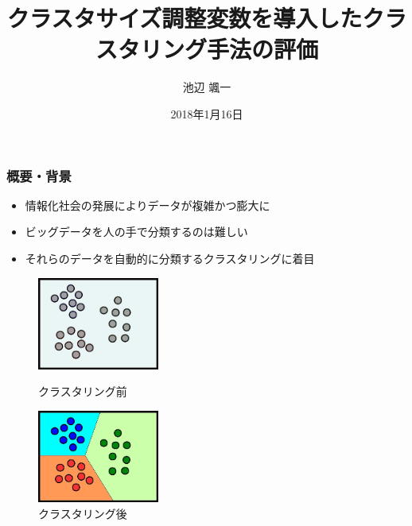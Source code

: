 \documentclass[13pt,dvipdfmx]{beamer}
\title{クラスタサイズ調整変数を導入したクラスタリング手法の評価}
\author{池辺 颯一}
\institute{芝浦工業大学 工学部 通信工学科}
\date{2018年1月16日}
\begin{document}
\begin{frame}\frametitle{}
 \titlepage
\end{frame}

\begin{frame}\frametitle{概要・背景}
\begin{itemize}
 \item 情報化社会の発展によりデータが複雑かつ膨大に
 \item ビッグデータを人の手で分類するのは難しい
 \item それらのデータを自動的に分類するクラスタリングに着目
\end{itemize}
\vspace{5mm}
\begin{figure}[htbp]
 \begin{minipage}{0.4\hsize}
  \begin{center}
   \includegraphics[width=40mm]{before_clustering.png}
  \end{center}
  \captionsetup{labelformat=empty,labelsep=none}
  \caption{クラスタリング前}
  \label{fig:one}
 \end{minipage}
\hspace{1cm}
 \begin{minipage}{0.4\hsize}
  \begin{center}
   \includegraphics[width=40mm]{after_clustering.png}
  \end{center}
  \captionsetup{labelformat=empty,labelsep=none}
  \caption{クラスタリング後}
  \label{fig:two}
 \end{minipage}
\end{figure}
\end{frame}
\end{document}
